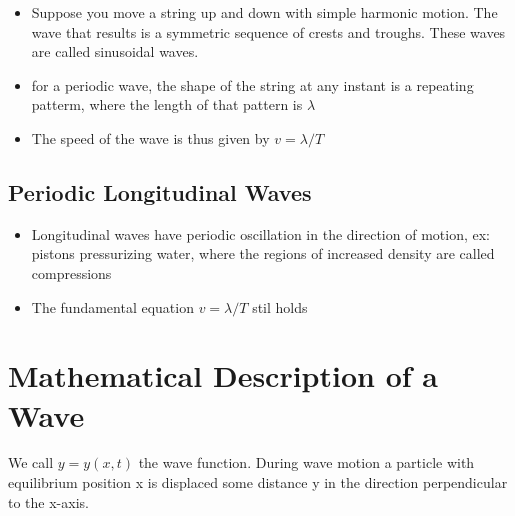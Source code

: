 \documentclass[11pt, a4paper]{article}
\begin{document}
\begin{itemize}
    \item Suppose you move a string up and down with simple harmonic motion. The wave
        that results is a symmetric sequence of crests and troughs. These waves are
        called sinusoidal waves.
    \item for a periodic wave, the shape of the string at any instant is a repeating patterm,
        where the length of that pattern is $\lambda$
    \item The speed of the wave is thus given by $v = \lambda/T$
\end{itemize}
\subsection{Periodic Longitudinal Waves}
\begin{itemize}
    \item Longitudinal waves have periodic oscillation in the direction of motion, ex: pistons
        pressurizing water, where the regions of increased density are called compressions
    \item The fundamental equation $v = \lambda/T$ stil holds
\end{itemize}
\section{Mathematical Description of a Wave}
We call $y = y(x,t)$ the wave function. During wave motion a particle with equilibrium position
x is displaced some distance y in the direction perpendicular to the x-axis.
\end{document}
